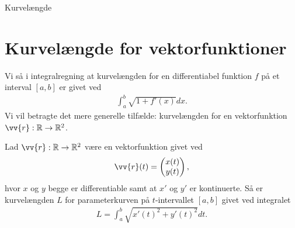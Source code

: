
\begin{center}
	\Huge
	Kurvelængde
\end{center}
\section*{Kurvelængde for vektorfunktioner}

Vi så i integralregning at kurvelængden for en differentiabel funktion $f$ på et interval $[a,b]$ er givet ved
\begin{align*}
	\int_a^b \sqrt{1+f'(x)}dx.
\end{align*}
Vi vil betragte det mere generelle tilfælde: kurvelængden for en vektorfunktion $\vv{r}:\mathbb{R}\to \mathbb{R}^2$. 

\begin{setn}[Kurvelængde]
	Lad $\vv{r}:\mathbb{R} \to \mathbb{R}^2$ være en vektorfunktion givet ved
	\begin{align*}
		\vv{r}(t) = 
		\begin{pmatrix}
			x(t)\\
			y(t)
		\end{pmatrix},
	\end{align*}
	hvor $x$ og $y$ begge er differentiable samt at $x'$ og $y'$ er kontinuerte. Så er kurvelængden $L$ for parameterkurven på $t$-intervallet $[a,b]$ givet ved integralet
	\begin{align*}
		L = \int_a^b\sqrt{x'(t)^2+y'(t)^2}dt.
	\end{align*}
\end{setn}
